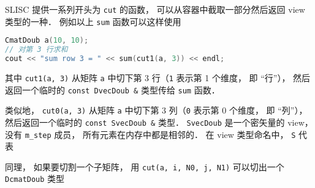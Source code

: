 SLISC 提供一系列开头为 \verb|cut| 的函数， 可以从容器中截取一部分然后返回 view 类型的一种． 例如以上 \verb|sum| 函数可以这样使用
\begin{lstlisting}[language=cpp]
CmatDoub a(10, 10);
// 对第 3 行求和
cout << "sum row 3 = " << sum(cut1(a, 3)) << endl;
\end{lstlisting}
其中 \verb|cut1(a, 3)| 从矩阵 \verb|a| 中切下第 3 行（\verb|1| 表示第 1 个维度， 即 “行”）， 然后返回一个临时的 \verb|const DvecDoub &| 类型传给 \verb|sum| 函数．

类似地， \verb|cut0(a, 3)| 从矩阵 \verb|a| 中切下第 3 列（\verb|0| 表示第 0 个维度， 即 “列”）， 然后返回一个临时的 \verb|const SvecDoub &| 类型． \verb|SvecDoub| 是一个密矢量的 view， 没有 \verb|m_step| 成员， 所有元素在内存中都是相邻的． 在 view 类型命名中， \verb|S| 代表 

同理， 如果要切割一个子矩阵， 用 \verb|cut(a, i, N0, j, N1)| 可以切出一个 \verb|DcmatDoub| 类型
